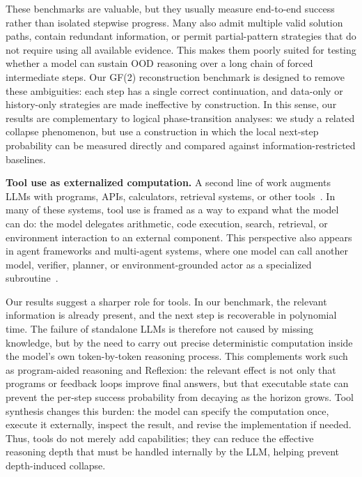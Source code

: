 \documentclass{article}
\begin{document}
These benchmarks are valuable, but they usually measure end-to-end success rather than isolated stepwise progress. Many also admit multiple valid solution paths, contain redundant information, or permit partial-pattern strategies that do not require using all available evidence. This makes them poorly suited for testing whether a model can sustain OOD reasoning over a long chain of forced intermediate steps. Our GF(2) reconstruction benchmark is designed to remove these ambiguities: each step has a single correct continuation, and data-only or history-only strategies are made ineffective by construction. In this sense, our results are complementary to logical phase-transition analyses: we study a related collapse phenomenon, but use a construction in which the local next-step probability can be measured directly and compared against information-restricted baselines.

\textbf{Tool use as externalized computation.\enspace}
A second line of work augments LLMs with programs, APIs, calculators, retrieval systems, or other tools~\citep{schick2023toolformer,hao2023toolkengpt,gao2023pal,chen2022program,cai2023large}. In many of these systems, tool use is framed as a way to expand what the model can do: the model delegates arithmetic, code execution, search, retrieval, or environment interaction to an external component. This perspective also appears in agent frameworks and multi-agent systems, where one model can call another model, verifier, planner, or environment-grounded actor as a specialized subroutine~\citep{wu2023autogen}.

Our results suggest a sharper role for tools. In our benchmark, the relevant information is already present, and the next step is recoverable in polynomial time. The failure of standalone LLMs is therefore not caused by missing knowledge, but by the need to carry out precise deterministic computation inside the model's own token-by-token reasoning process. This complements work such as program-aided reasoning and Reflexion: the relevant effect is not only that programs or feedback loops improve final answers, but that executable state can prevent the per-step success probability from decaying as the horizon grows. Tool synthesis changes this burden: the model can specify the computation once, execute it externally, inspect the result, and revise the implementation if needed. Thus, tools do not merely add capabilities; they can reduce the effective reasoning depth that must be handled internally by the LLM, helping prevent depth-induced collapse.
\end{document}
